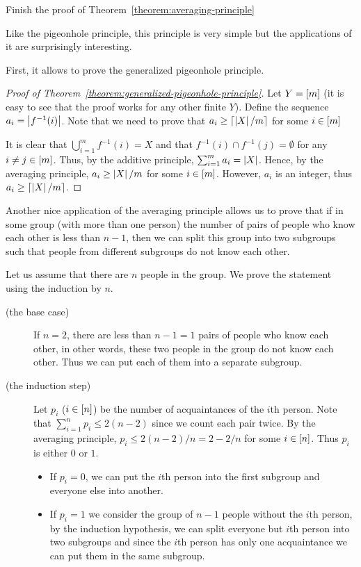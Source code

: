 \begin{exercise}
  Finish the proof of Theorem~\ref{theorem:averaging-principle}
\end{exercise}

Like the pigeonhole principle, this principle is very simple but the
applications of it are surprisingly interesting.

First, it allows to prove the generalized pigeonhole principle.
\begin{proof}[Proof of Theorem~\ref{theorem:generalized-pigeonhole-principle}]
  Let $Y = {[{m}]}$ (it is easy to see that the proof works for any other finite
  $Y$). Define the sequence $a_i = \left|{f^{-1}(i)}\right|$.
  Note that we need to prove that $a_i \ge \left\lceil {\left|{X}\right| / m} \right\rceil$ for some
  $i \in {[{m}]}$

  It is clear that $\bigcup_{i = 1}^m f^{-1}(i) = X$ and that $f^{-1}(i) \cap
  f^{-1}(j) = \emptyset$ for any $i \neq j \in {[{m}]}$. Thus, by the additive
  principle, $\sum_{i = 1}^m a_i = \left|{X}\right|$. Hence, by the averaging
  principle, $a_i \ge \left|{X}\right| / m$ for some $i \in {[{m}]}$. However,
  $a_i$ is an integer, thus $a_i \ge \left\lceil {\left|{X}\right| / m} \right\rceil$.
\end{proof}

Another nice application of the averaging principle allows us to prove that if
in some group (with more than one person) the number of pairs of people who
know each other is less than $n - 1$, then we can split this group into two
subgroups such that people from different subgroups do not know each other.

Let us assume that there are $n$ people in the group. We prove the statement
using the induction by $n$.
\begin{description}
  \item [(the base case)] If $n = 2$, there are less than $n - 1 = 1$ pairs
    of people who know each other, in other words, these two people in the
    group do not know each other. Thus we can put each of them into a separate
    subgroup.
  \item [(the induction step)] Let $p_i$ ($i \in {[{n}]}$) be the number of
    acquaintances of the $i$th person. Note that
    $\sum_{i = 1}^n p_i \le 2(n - 2)$ since we count each pair twice.
    By the averaging principle, $p_i \le 2(n - 2) / n = 2 - 2 / n$ for some
    $i \in {[{n}]}$.  Thus $p_i$ is either $0$ or $1$.
    \begin{itemize}
      \item If $p_i = 0$, we can put the $i$th person into the first subgroup
        and everyone else into another.
      \item If $p_i = 1$ we consider the group of $n - 1$ people without the
        $i$th person, by the induction hypothesis, we can split everyone but
        $i$th person into two subgroups and since the $i$th person has only one
        acquaintance we can put them in the same subgroup.
      \end{itemize}
\end{description}



